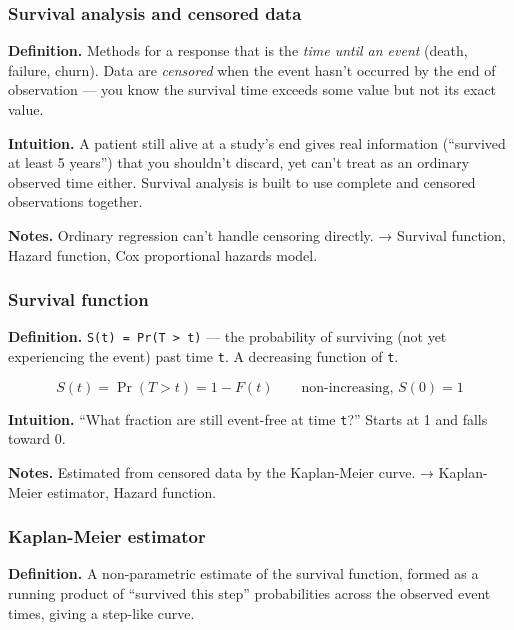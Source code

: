 \documentclass[
  10pt,
  letterpaper,
  onecolumn]{article}
\begin{document}
\hypertarget{survival-analysis-and-censored-data}{%
\subsubsection{Survival analysis and censored
data}\label{survival-analysis-and-censored-data}}

\textbf{Definition.} Methods for a response that is the \emph{time until
an event} (death, failure, churn). Data are \emph{censored} when the
event hasn't occurred by the end of observation --- you know the
survival time exceeds some value but not its exact value.

\textbf{Intuition.} A patient still alive at a study's end gives real
information (``survived at least 5 years'') that you shouldn't discard,
yet can't treat as an ordinary observed time either. Survival analysis
is built to use complete and censored observations together.

\textbf{Notes.} Ordinary regression can't handle censoring directly. →
Survival function, Hazard function, Cox proportional hazards model.

\hypertarget{survival-function}{%
\subsubsection{Survival function}\label{survival-function}}

\textbf{Definition.} \texttt{S(t)\ =\ Pr(T\ \textgreater{}\ t)} --- the
probability of surviving (not yet experiencing the event) past time
\texttt{t}. A decreasing function of \texttt{t}.

\begin{equation*}
S(t)=\Pr(T>t)=1-F(t)
\qquad\text{non-increasing, }S(0)=1
\end{equation*}

\textbf{Intuition.} ``What fraction are still event-free at time
\texttt{t}?'' Starts at 1 and falls toward 0.

\textbf{Notes.} Estimated from censored data by the Kaplan-Meier curve.
→ Kaplan-Meier estimator, Hazard function.

\hypertarget{kaplan-meier-estimator}{%
\subsubsection{Kaplan-Meier estimator}\label{kaplan-meier-estimator}}

\textbf{Definition.} A non-parametric estimate of the survival function,
formed as a running product of ``survived this step'' probabilities
across the observed event times, giving a step-like curve.
\end{document}

